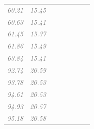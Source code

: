 \documentclass[
  letterpaper,
  DIV=11,
  numbers=noendperiod]{scrartcl}
\newcommand{\cmark}{\ding{51}}
\begin{document}
\begin{longtable}[t]{llccccll}
\textcolor{gray}{\em{60.21}} & \textcolor{gray}{\em{15.45}} & \textcolor{gray}{\em{\cmark}} & \textcolor{gray}{\em{}} & \textcolor{gray}{\em{}} & \textcolor{gray}{\em{}} & \textcolor{gray}{\em{\cmark}} & \textcolor{gray}{\em{\cmark}}\\
\textcolor{gray}{\em{60.63}} & \textcolor{gray}{\em{15.41}} & \textcolor{gray}{\em{}} & \textcolor{gray}{\em{}} & \textcolor{gray}{\em{}} & \textcolor{gray}{\em{}} & \textcolor{gray}{\em{\cmark}} & \textcolor{gray}{\em{\cmark}}\\
\addlinespace
\textcolor{gray}{\em{61.45}} & \textcolor{gray}{\em{15.37}} & \textcolor{gray}{\em{}} & \textcolor{gray}{\em{}} & \textcolor{gray}{\em{}} & \textcolor{gray}{\em{\cmark}} & \textcolor{gray}{\em{\cmark}} & \textcolor{gray}{\em{}}\\
\textcolor{gray}{\em{61.86}} & \textcolor{gray}{\em{15.49}} & \textcolor{gray}{\em{}} & \textcolor{gray}{\em{}} & \textcolor{gray}{\em{}} & \textcolor{gray}{\em{\cmark}} & \textcolor{gray}{\em{\cmark}} & \textcolor{gray}{\em{\cmark}}\\
\textcolor{gray}{\em{63.84}} & \textcolor{gray}{\em{15.41}} & \textcolor{gray}{\em{\cmark}} & \textcolor{gray}{\em{}} & \textcolor{gray}{\em{\cmark}} & \textcolor{gray}{\em{\cmark}} & \textcolor{gray}{\em{\cmark}} & \textcolor{gray}{\em{}}\\
\textcolor{gray}{\em{92.74}} & \textcolor{gray}{\em{20.59}} & \textcolor{gray}{\em{}} & \textcolor{gray}{\em{}} & \textcolor{gray}{\em{}} & \textcolor{gray}{\em{}} & \textcolor{gray}{\em{}} & \textcolor{gray}{\em{}}\\
\textcolor{gray}{\em{93.78}} & \textcolor{gray}{\em{20.53}} & \textcolor{gray}{\em{}} & \textcolor{gray}{\em{}} & \textcolor{gray}{\em{\cmark}} & \textcolor{gray}{\em{}} & \textcolor{gray}{\em{}} & \textcolor{gray}{\em{\cmark}}\\
\addlinespace
\textcolor{gray}{\em{94.61}} & \textcolor{gray}{\em{20.53}} & \textcolor{gray}{\em{\cmark}} & \textcolor{gray}{\em{}} & \textcolor{gray}{\em{\cmark}} & \textcolor{gray}{\em{}} & \textcolor{gray}{\em{}} & \textcolor{gray}{\em{}}\\
\textcolor{gray}{\em{94.93}} & \textcolor{gray}{\em{20.57}} & \textcolor{gray}{\em{}} & \textcolor{gray}{\em{}} & \textcolor{gray}{\em{\cmark}} & \textcolor{gray}{\em{\cmark}} & \textcolor{gray}{\em{}} & \textcolor{gray}{\em{\cmark}}\\
\textcolor{gray}{\em{95.18}} & \textcolor{gray}{\em{20.58}} & \textcolor{gray}{\em{\cmark}} & \textcolor{gray}{\em{}} & \textcolor{gray}{\em{\cmark}} & \textcolor{gray}{\em{\cmark}} & \textcolor{gray}{\em{}} & \textcolor{gray}{\em{}}\\

\end{longtable}
\end{document}
